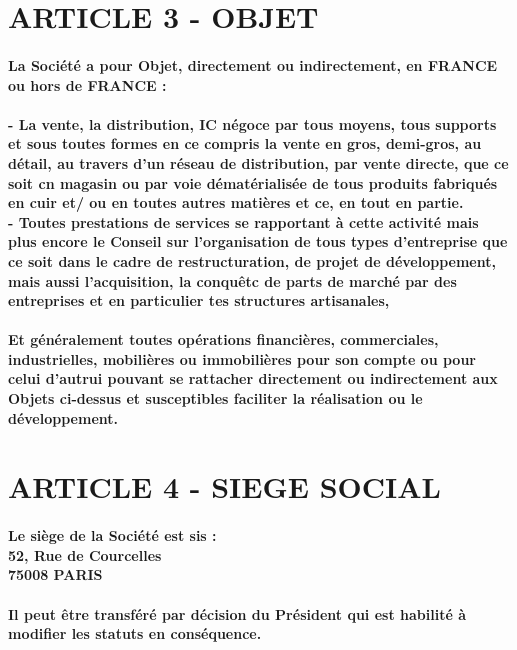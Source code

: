 \documentclass[a4paper, 11pt]{article}
\begin{document}
\section*{ARTICLE 3 - OBJET}

\paragraph{
  La Société a pour Objet, directement ou indirectement, en FRANCE ou hors de FRANCE :
}

\paragraph{
  - La vente, la distribution, IC négoce par tous moyens, tous supports et sous toutes formes en ce compris la vente en gros, demi-gros, au détail, au travers d'un réseau de distribution, par vente directe, que ce soit cn magasin ou par voie dématérialisée de tous produits fabriqués en cuir et/ ou en toutes autres matières et ce, en tout en partie.\\
  - Toutes prestations de services se rapportant à cette activité mais plus encore le Conseil sur l'organisation de tous types d'entreprise que ce soit dans le cadre de restructuration, de projet de développement, mais aussi l'acquisition, la conquêtc de parts de marché par des entreprises et en particulier tes structures artisanales,
}

\paragraph{
  Et généralement toutes opérations financières, commerciales, industrielles, mobilières ou immobilières pour son compte ou pour celui d'autrui pouvant se rattacher directement ou indirectement aux Objets ci-dessus et susceptibles faciliter la réalisation ou le développement.
}
\section*{ARTICLE 4 - SIEGE SOCIAL}

\paragraph{
  Le siège de la Société est sis :\\
  52, Rue de Courcelles\\
  75008 PARIS\\
}

\paragraph{
  Il peut être transféré par décision du Président qui est habilité à modifier les statuts en conséquence.
}
\end{document}

